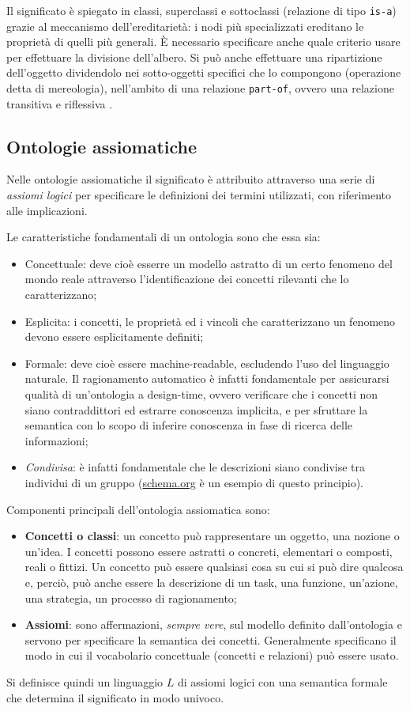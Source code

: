 \documentclass[11pt]{article}
\begin{document}
Il significato è spiegato in classi, superclassi e sottoclassi (relazione di tipo \verb|is-a|) grazie al meccanismo dell'ereditarietà: i nodi più specializzati ereditano le proprietà di quelli più generali.
È necessario specificare anche quale criterio usare per effettuare la divisione dell'albero.
Si può anche effettuare una ripartizione dell'oggetto dividendolo nei sotto-oggetti specifici che lo compongono (operazione detta di mereologia), nell'ambito di una relazione \verb|part-of|, ovvero una relazione transitiva e riflessiva .

\subsection{Ontologie assiomatiche}
Nelle ontologie assiomatiche il significato è attribuito attraverso una serie di \textit{assiomi logici} per specificare le definizioni dei termini utilizzati, con riferimento alle implicazioni. 

Le caratteristiche fondamentali di un ontologia sono che essa sia:
\begin{itemize}
\item Concettuale: deve cioè esserre un modello astratto di un certo fenomeno del mondo reale attraverso l'identificazione dei concetti rilevanti che lo caratterizzano;
\item Esplicita: i concetti, le proprietà ed i vincoli che caratterizzano un fenomeno devono essere esplicitamente definiti;
\item Formale: deve cioè essere machine-readable, escludendo l'uso del linguaggio naturale. Il ragionamento automatico è infatti fondamentale per assicurarsi qualità di un'ontologia a design-time, ovvero verificare che i concetti non siano contraddittori ed estrarre conoscenza implicita, e per sfruttare la semantica con lo scopo di inferire conoscenza in fase di ricerca delle informazioni;
\item \textit{Condivisa}: è infatti fondamentale che le descrizioni siano condivise tra individui di un gruppo (\url{schema.org} è un esempio di questo principio).
\end{itemize}
Componenti principali dell'ontologia assiomatica sono:
\begin{itemize}
\item \textbf{Concetti o classi}: un concetto può rappresentare un oggetto, una nozione o un'idea. I concetti possono essere astratti o concreti, elementari o composti, reali o fittizi. Un concetto può essere qualsiasi cosa su cui si può dire qualcosa e, perciò, può anche essere la descrizione di un task, una funzione, un'azione, una strategia, un processo di ragionamento;
\item \textbf{Assiomi}: sono affermazioni, \textit{sempre vere}, sul modello definito dall'ontologia e servono per specificare la semantica dei concetti. Generalmente specificano il modo in cui il vocabolario concettuale (concetti e relazioni) può essere usato.
\end{itemize}
Si definisce quindi un linguaggio $L$ di assiomi logici con una semantica formale che determina il significato in modo univoco.
\end{document}
